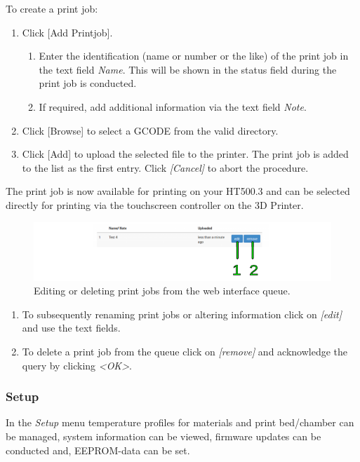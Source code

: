To create a print job:

\begin{enumerate}
  \item Click [Add Printjob].
    \begin{enumerate}
      \item Enter the identification (name or number or the like) of the print job in the text field \emph{Name}. This will be shown in the status field during the print job is conducted.
      \item If required, add additional information via the text field \emph{Note}.
    \end{enumerate}
  \item Click [Browse] to select a GCODE from the valid directory.
  \item Click [Add] to upload the selected file to the printer. The print job is 
        added to the list as the first entry.
        Click \emph{[Cancel]} to abort the procedure.
\end{enumerate}

The print job is now available for printing on your HT500.3 and can be selected directly for printing via the touchscreen controller on the 3D Printer.

\begin{figure}[H]
  \centering
  \includegraphics[width=.7\linewidth]{./img/wi_queue_3.png}
  \caption{Editing or deleting print jobs from the web interface queue.}
\end{figure}

\begin{enumerate}
  \item To subsequently renaming print jobs or altering information 
        click on \emph{[edit]} and use the text fields.
  \item To delete a print job from the queue click on \emph{[remove]} and 
        acknowledge the query by clicking \emph{<OK>}.
\end{enumerate}


\subsubsection{Setup}

In the \emph{Setup} menu temperature profiles for materials and print bed/chamber can be managed, system information can be viewed, firmware updates can be conducted and, EEPROM-data can be set. 

